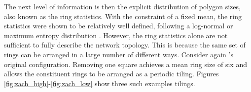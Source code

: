 The next level of information is then the explicit distribution of polygon sizes, also known as the ring statistics.
With the constraint of a fixed mean, the ring statistics were shown to be relatively well defined, following a log\--normal or maximum entropy distribution \cite{Shackelford1981,Lemaitre1993,Lichtenstein2012}.
However, the ring statistics alone are not sufficient to fully describe the network topology. 
This is because the same set of rings can be arranged in a large number of different ways.
Consider again \zach's original configuration. 
Removing one square achieves a mean ring size of six and allows the constituent rings to be arranged as a periodic tiling.
Figures \ref{fig:zach_high}\--\ref{fig:zach_low} show three such examples tilings.


\begin{figure}[h]
     \centering
     

\end{figure}
